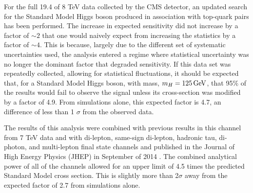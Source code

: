 \par  For the full 19.4 \fbinv of 8 TeV data collected by the CMS
detector, an updated search for the Standard Model Higgs boson produced in
association with top-quark pairs has been performed.  The increase in
expected sensitivity did not increase by a factor of $\sim2$ that one
would naively expect from increasing the statistics by a factor of
$\sim4$.  This is because, largely due to the different set of
systematic uncertainties used, the analysis entered a regime where
statistical uncertainty was no longer the dominant factor that
degraded sensitivity.  If this data set was repeatedly
collected, allowing for statistical fluctuations, it should be
expected that, for a Standard Model Higgs boson, with mass, $m_{H} =
125 \,\text{Ge\hspace{-.08em}V}$, that 95$\%$ of the results would fail to observe the \ttH
signal unless its cross-section was modified by a factor of 4.9.  From
simulations alone, this expected factor is 4.7, an difference of less
than 1 $\sigma$ from the observed data.    

\par The results of this analysis were combined with previous results
in this channel from 7 TeV data and with di-lepton, same-sign
di-lepton, hadronic tau, di-photon, and multi-lepton final state
channels and published in the Journal of High Energy Physics (JHEP) in
September of 2014 \cite{Khachatryan:2014qaa}.  The combined analytical power
of all of the channels allowed for an upper limit of 4.5 times
the predicted Standard Model cross section.  This is slightly more than
2$\sigma$ away from the expected factor of 2.7 from simulations
alone.  